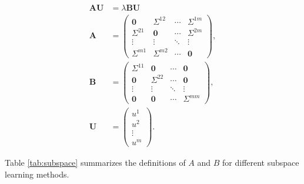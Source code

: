 \begin{align}
    \mathbf{A} \mathbf{U} &= \lambda \mathbf{B} \mathbf{U} \\
    \mathbf{A} &= \begin{pmatrix}
        \mathbf{0} & \Sigma^{12} & \cdots & \Sigma^{1m} \\
        \Sigma^{21} & \mathbf{0} & \cdots & \Sigma^{2m} \\
        \vdots & \vdots & \ddots & \vdots \\
        \Sigma^{m1} & \Sigma^{m2} & \cdots & \mathbf{0}
    \end{pmatrix}, \\
    \mathbf{B} &= \begin{pmatrix}
        \Sigma^{11} & \mathbf{0} & \cdots & \mathbf{0} \\
        \mathbf{0} & \Sigma^{22} & \cdots & \mathbf{0} \\
        \vdots & \vdots & \ddots & \vdots \\
        \mathbf{0} & \mathbf{0} & \cdots & \Sigma^{mm}
    \end{pmatrix}, \\
    \mathbf{U} &= \begin{pmatrix}
        u^{1} \\
        u^{2} \\
        \vdots \\
        u^{m}
    \end{pmatrix}.
\end{align}


Table \ref{tab:subspace} summarizes the definitions of $A$ and $B$ for different subspace learning methods.

